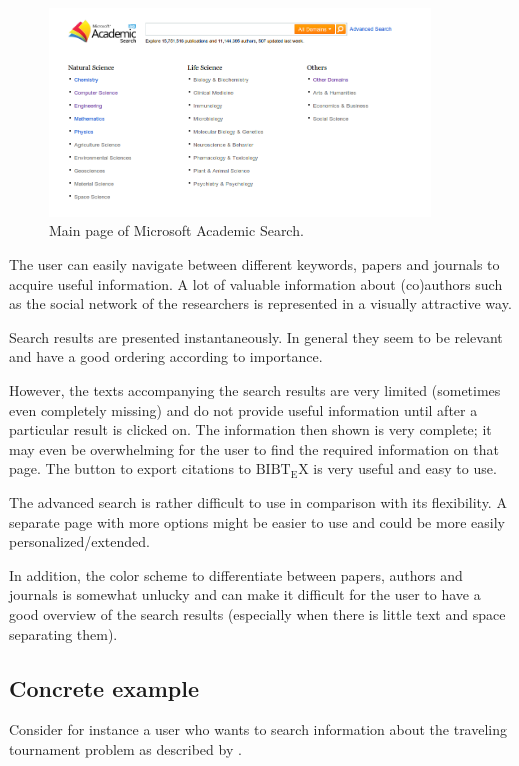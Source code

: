 \documentclass[12pt]{article}
\begin{document}
\begin{figure}[hbpt]
 \centering
 \includegraphics[width=0.9\textwidth]{main}
 \caption{Main page of Microsoft Academic Search.}
 \label{mainsearch}
\end{figure}

The user can easily navigate between different keywords, papers and journals to acquire useful information. 
A lot of valuable information about (co)authors such as the social network of the researchers is represented in a visually attractive way. 

Search results are presented instantaneously. In general they seem to be relevant and have a good ordering according to importance.

However, the texts accompanying the search results are very limited (sometimes even completely missing) and do not provide useful information until after a particular result is clicked on. The information then shown is very complete; it may even be overwhelming for the user to find the required information on that page.
The button to export citations to ${\mathrm{B{\scriptstyle{IB}} \! T\!_{\displaystyle E} \! X}}$ is very useful and easy to use.

The advanced search is rather difficult to use in comparison with its flexibility. A separate page with more options might be easier to use and could be more easily personalized/extended.

In addition, the color scheme to differentiate between papers, authors and journals is somewhat unlucky and can make it difficult for the user to have a good overview of the search results (especially when there is little text and space separating them).

\subsection{Concrete example}
Consider for instance a user who wants to search information about the traveling tournament problem as described by \cite{ttp}.
\end{document}

